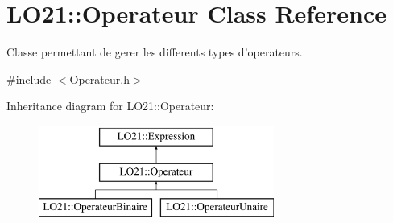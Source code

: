 \hypertarget{class_l_o21_1_1_operateur}{\section{\-L\-O21\-:\-:\-Operateur \-Class \-Reference}
\label{class_l_o21_1_1_operateur}
}


\-Classe permettant de gerer les differents types d'operateurs.  




{\ttfamily \#include $<$\-Operateur.\-h$>$}

\-Inheritance diagram for \-L\-O21\-:\-:\-Operateur\-:\begin{figure}[H]
\begin{center}
\leavevmode
\includegraphics[height=3.000000cm]{class_l_o21_1_1_operateur}
\end{center}
\end{figure}
